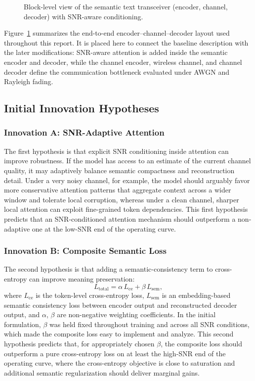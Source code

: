 \begin{figure}[!htb]
\centering
{}
\caption{Block-level view of the semantic text transceiver (encoder, channel, decoder) with SNR-aware conditioning.}
\label{fig:architecture}
\end{figure}
Figure~\ref{fig:architecture} summarizes the end-to-end encoder–channel–decoder layout used throughout this report. It is placed here to connect the baseline description with the later modifications: SNR-aware attention is added inside the semantic encoder and decoder, while the channel encoder, wireless channel, and channel decoder define the communication bottleneck evaluated under AWGN and Rayleigh fading.

\subsection{Initial Innovation Hypotheses}

\subsubsection{Innovation A: SNR-Adaptive Attention}

The first hypothesis is that explicit SNR conditioning inside attention can improve robustness. If the model has access to an estimate of the current channel quality, it may adaptively balance semantic compactness and reconstruction detail. Under a very noisy channel, for example, the model should arguably favor more conservative attention patterns that aggregate context across a wider window and tolerate local corruption, whereas under a clean channel, sharper local attention can exploit fine-grained token dependencies. This first hypothesis predicts that an SNR-conditioned attention mechanism should outperform a non-adaptive one at the low-SNR end of the operating curve.

\subsubsection{Innovation B: Composite Semantic Loss}

The second hypothesis is that adding a semantic-consistency term to cross-entropy can improve meaning preservation:
\begin{equation}
L_{\mathrm{total}} = \alpha\, L_{\mathrm{ce}} + \beta\, L_{\mathrm{sem}},
\end{equation}
where $L_{\mathrm{ce}}$ is the token-level cross-entropy loss, $L_{\mathrm{sem}}$ is an embedding-based semantic consistency loss between encoder output and reconstructed decoder output, and $\alpha$, $\beta$ are non-negative weighting coefficients. In the initial formulation, $\beta$ was held fixed throughout training and across all SNR conditions, which made the composite loss easy to implement and analyze. This second hypothesis predicts that, for appropriately chosen $\beta$, the composite loss should outperform a pure cross-entropy loss on at least the high-SNR end of the operating curve, where the cross-entropy objective is close to saturation and additional semantic regularization should deliver marginal gains.


